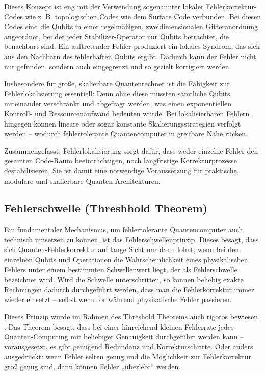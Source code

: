 Dieses Konzept ist eng mit der Verwendung sogenannter lokaler Fehlerkorrektur-Codes wie z. B. topologischen Codes wie dem Surface Code verbunden. Bei diesen Codes sind die Qubits in einer regelmäßigen, zweidimensionalen Gitteranordnung angeordnet, bei der jeder Stabilizer-Operator nur Qubits betrachtet, die benachbart sind. Ein auftretender Fehler produziert ein lokales Syndrom, das sich aus den Nachbarn des fehlerhaften Qubits ergibt. Dadurch kann der Fehler nicht nur gefunden, sondern auch eingegrenzt und so gezielt korrigiert werden. \cite{Fowler et al}

Insbesondere für große, skalierbare Quantenrechner ist die Fähigkeit zur Fehlerlokalisierung essentiell: Denn ohne diese müssten sämtliche Qubits miteinander verschränkt und abgefragt werden, was einen exponentiellen Kontroll- und Ressourcenaufwand bedeuten würde. Bei lokalisierbaren Fehlern hingegen können lineare oder sogar konstante Skalierungsstrategien verfolgt werden – wodurch fehlertolerante Quantencomputer in greifbare Nähe rücken.

Zusammengefasst: Fehlerlokalisierung sorgt dafür, dass weder einzelne Fehler den gesamten Code-Raum beeinträchtigen, noch langfristige Korrekturprozesse destabilisieren. Sie ist damit eine notwendige Voraussetzung für praktische, modulare und skalierbare Quanten-Architekturen.

\subsection{Fehlerschwelle (Threshhold Theorem)}
Ein fundamentaler Mechanismus, um fehlertolerante Quantencomputer auch technisch umsetzen zu können, ist das Fehlerschwellenprinzip. Dieses besagt, dass sich Quanten-Fehlerkorrektur auf lange Sicht nur dann lohnt, wenn bei den einzelnen Qubits und Operationen die Wahrscheinlichkeit eines physikalischen Fehlers unter einem bestimmten Schwellenwert liegt, der als Fehlerschwelle bezeichnet wird. Wird die Schwelle unterschritten, so können beliebig exakte Rechnungen dadurch durchgeführt werden, dass man die Fehlerkorrektur immer wieder einsetzt – selbst wenn fortwährend physikalische Fehler passieren. \cite[Seite 454-456]{nielsen_michael_a_and_isaac_l_chuang_quantum_2010}

Dieses Prinzip wurde im Rahmen des Threshold Theorems auch rigoros bewiesen \cite{Aharonov und Ben-Or}. Das Theorem besagt, dass bei einer hinreichend kleinen Fehlerrate jedes Quanten-Computing mit beliebiger Genauigkeit durchgeführt werden kann – vorausgesetzt, es gibt genügend Redundanz und Korrekturschritte. Oder anders ausgedrückt: wenn Fehler selten genug und die Möglichkeit zur Fehlerkorrektur groß genug sind, dann können Fehler „überlebt“ werden.

